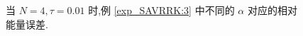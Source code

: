 \documentclass[aspectratio=169]{beamer}
\numberwithin{theorem}{section} %
\begin{document}
\begin{frame}%
	\begin{figure}[H]
		\begin{center}
		\caption{当 $N=4, \tau=0.01$ 时,例 \ref{exp_SAVRRK:3} 中不同的 $\alpha$ 对应的相对能量误差.}
		\label{fig_SAVRRK:3-4}
		\end{center}
		\end{figure}
\end{frame}
\end{document}
